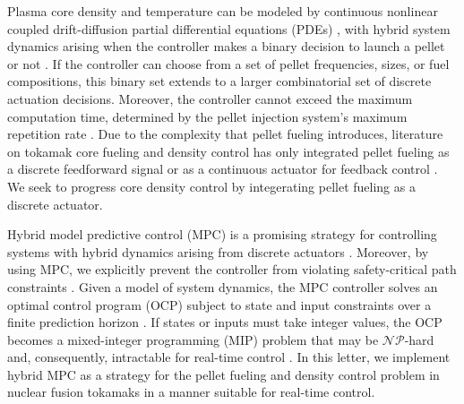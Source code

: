 \documentclass[journal,twoside,web]{ieeecolor}
\begin{document}
Plasma core density and temperature can be modeled by continuous nonlinear coupled drift-diffusion partial differential equations (PDEs) \cite{Blanken2018, Sevillano2012}, with hybrid system dynamics arising when the controller makes a binary decision to launch a pellet or not \cite{Bemporad1999}. If the controller can choose from a set of pellet frequencies, sizes, or fuel compositions, this binary set extends to a larger combinatorial set of discrete actuation decisions. Moreover, the controller cannot exceed the maximum computation time, determined by the pellet injection system's maximum repetition rate \cite{Baylor2016}. Due to the complexity that pellet fueling introduces, literature on tokamak core fueling and density control has only integrated pellet fueling as a discrete feedforward signal \cite{Garzotti2011, Vincenzi2015, Ravensbergen2017} or as a continuous actuator for feedback control \cite{Lang2018, Bosman2021, Bosman2022}. We seek to progress core density control by integerating pellet fueling as a discrete actuator. 

Hybrid model predictive control (MPC) \cite{Bemporad1999,Lazar2006} is a promising strategy for controlling systems with hybrid dynamics arising from discrete actuators \cite{Bemporad1999}. Moreover, by using MPC, we explicitly prevent the controller from violating safety-critical path constraints \cite{Bosman2021, Bosman2022}. Given a model of system dynamics, the MPC controller solves an optimal control program (OCP) subject to state and input constraints over a finite prediction horizon \cite{Rawlings2017}. If states or inputs must take integer values, the OCP becomes a mixed-integer programming (MIP) problem that may be $\mathcal{N} \! \mathcal{P}$-hard and, consequently, intractable for real-time control \cite{Kirches2011}. In this letter, we implement hybrid MPC as a strategy for the pellet fueling and density control problem in nuclear fusion tokamaks in a manner suitable for real-time control. 
\end{document}
